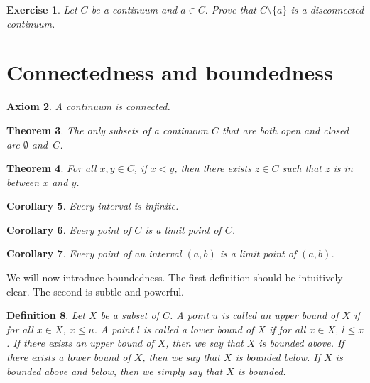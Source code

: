 \documentclass{amsart}
\newtheorem{theorem}{Theorem}
\newtheorem{axiom}[theorem]{Axiom}
\newtheorem{definition}[theorem]{Definition}
\newtheorem{corollary}[theorem]{Corollary}
\newtheorem{exercise}[theorem]{Exercise}
\newcommand{\1}{\mathds{1}}
\numberwithin{equation}{section}
\numberwithin{theorem}{section}
\begin{document}
\begin{exercise} Let $C$ be a continuum and $a\in C.$ Prove that $C\setminus\{a\}$ is a disconnected continuum.
\end{exercise} 



\section{Connectedness and boundedness}


\begin{axiom}
A continuum is connected.
\end{axiom}

\begin{theorem}
The only subsets of a continuum $C$ that are both open and closed are $\emptyset$ and~$C$.
\end{theorem}

\begin{theorem}
For all $x, y \in C$, if $x < y$, then there exists $z \in C$ such that $z$ is in between $x$ and $y$.
\end{theorem}

\begin{corollary}
Every interval is infinite.
\end{corollary}

\begin{corollary}  Every point of $C$ is a limit point of $C$.  
\end{corollary}

\begin{corollary} 
Every point of an interval $(a,b)$ is a limit point of $(a,b)$.
\end{corollary}




We will now introduce boundedness.   The first definition should be intuitively clear.  The second is subtle and powerful.  


\begin{definition}  Let $X$ be a subset of $C$.  A point $u$ is called an \emph{upper bound} of $X$ if for all $x \in X$, $x \leq u$.  A point $l$ is called a \emph{lower bound} of $X$ if for all $x \in X$, $l \leq x$.  If there exists an upper bound of $X$, then we say that $X$ is \emph{bounded above}.  If there exists a lower bound of $X$, then we say that $X$ is \emph{bounded below}.  If $X$ is bounded above and below, then we simply say that $X$ is \emph{bounded}.
\end{definition}
\end{document}
